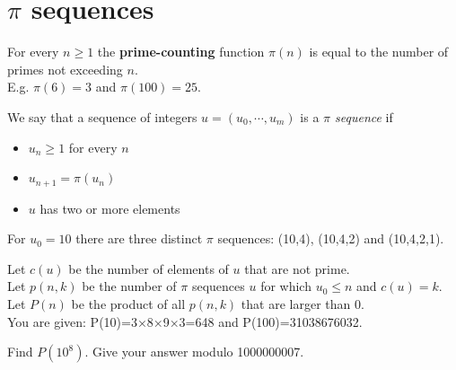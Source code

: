 \section[Problem \#609: $π$ sequences]{$π$ sequences}
\label{sec:problem_609}

For every $n \ge 1$ the \textbf{prime-counting} function
$\pi(n)$ is equal to the number of primes not exceeding
$n$.\\
E.g. $\pi(6)=3$ and $\pi(100)=25$.

We say that a sequence of integers $u  = (u_0,\cdots,u_m)$ is a
\emph{$\pi$ sequence} if

\begin{itemize}
\tightlist
\item
  $u_n \ge 1$ for every $n$
\item
  $u_{n+1}= \pi(u_n)$
\item
  $u$ has two or more elements
\end{itemize}

For $u_0=10$ there are three distinct $\pi$
sequences: (10,4), (10,4,2) and (10,4,2,1).

Let $c(u)$ be the number of elements of
$u$ that are not prime.\\
Let $p(n,k)$ be the number of $\pi$
sequences $u$ for which $u_0\le n$ and
$c(u)=k$.\\
Let $P(n)$ be the product of all $p(n,k)$
that are larger than 0.\\
You are given: P(10)=3×8×9×3=648 and P(100)=31038676032.

Find $P(10^8)$. Give your answer modulo 1000000007.